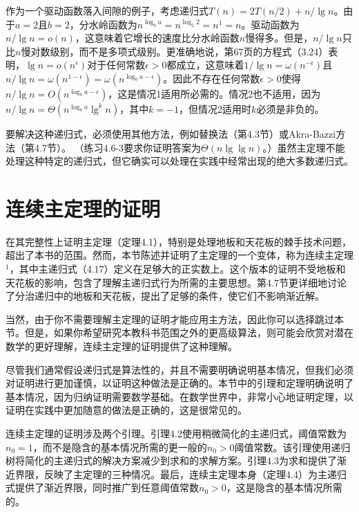 \documentclass[lang=cn,newtx,10pt,scheme=chinese]{elegantbook}
\begin{document}
作为一个驱动函数落入间隙的例子，考虑递归式$T(n)=2 T(n / 2)+n / \lg n$。由于$a=2$且$b=2$，分水岭函数为$n^{\log _b a}=n^{\log _2 2}=n^1=n$。驱动函数为$n / \lg n=o(n)$，这意味着它增长的速度比分水岭函数$n$慢得多。但是，$n / \lg n$只比$n$慢对数级别，而不是多项式级别。更准确地说，第67页的方程式（3.24）表明，$\lg n=o\left(n^\epsilon\right)$对于任何常数$\epsilon>0$都成立，这意味着$1 / \lg n=\omega\left(n^{-\epsilon}\right)$且$n / \lg n=\omega\left(n^{1-\epsilon}\right)=\omega\left(n^{\log _b a-\epsilon}\right)$。因此不存在任何常数$\epsilon>0$使得$n / \lg n=O\left(n^{\log _b a-\epsilon}\right)$，这是情况1适用所必需的。情况2也不适用，因为$n / \lg n=\Theta\left(n^{\log _b a} \lg ^k n\right)$，其中$k=-1$，但情况2适用时$k$必须是非负的。

要解决这种递归式，必须使用其他方法，例如替换法（第4.3节）或Akra-Bazzi方法（第4.7节）。 （练习4.6-3要求你证明答案为$\Theta(n \lg \lg n)$。）虽然主定理不能处理这种特定的递归式，但它确实可以处理在实践中经常出现的绝大多数递归式。

\section{连续主定理的证明}

在其完整性上证明主定理（定理4.1），特别是处理地板和天花板的棘手技术问题，超出了本书的范围。然而，本节陈述并证明了主定理的一个变体，称为连续主定理${ }^1$，其中主递归式（4.17）定义在足够大的正实数上。这个版本的证明不受地板和天花板的影响，包含了理解主递归式行为所需的主要思想。第4.7节更详细地讨论了分治递归中的地板和天花板，提出了足够的条件，使它们不影响渐近解。

当然，由于你不需要理解主定理的证明才能应用主方法，因此你可以选择跳过本节。但是，如果你希望研究本教科书范围之外的更高级算法，则可能会欣赏对潜在数学的更好理解，连续主定理的证明提供了这种理解。

尽管我们通常假设递归式是算法性的，并且不需要明确说明基本情况，但我们必须对证明进行更加谨慎，以证明这种做法是正确的。本节中的引理和定理明确说明了基本情况，因为归纳证明需要数学基础。在数学世界中，非常小心地证明定理，以证明在实践中更加随意的做法是正确的，这是很常见的。

连续主定理的证明涉及两个引理。引理4.2使用稍微简化的主递归式，阈值常数为$n_0=1$，而不是隐含的基本情况所需的更一般的$n_0>0$阈值常数。该引理使用递归树将简化的主递归式的解决方案减少到求和的求解方案。引理4.3为求和提供了渐近界限，反映了主定理的三种情况。最后，连续主定理本身（定理4.4）为主递归式提供了渐近界限，同时推广到任意阈值常数$n_0>0$，这是隐含的基本情况所需的。
\end{document}

